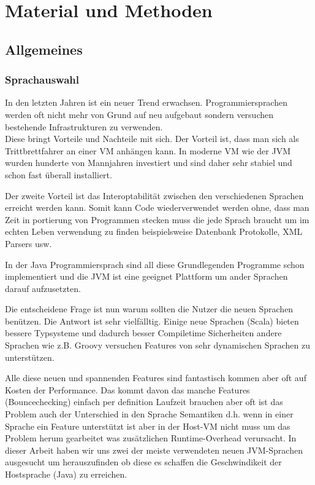 \documentclass{fancydocument}
\begin{document}
\section{Material und Methoden}

\subsection{Allgemeines}

\subsubsection{Sprachauswahl}

In den letzten Jahren ist ein neuer Trend
erwachsen. Programmiersprachen werden oft nicht mehr von Grund auf neu
aufgebaut sondern versuchen bestehende Infrastrukturen zu verwenden.
\\
Diese bringt Vorteile und Nachteile mit sich. Der Vorteil ist, dass
man sich als Trittbrettfahrer an einer VM anh\"angen kann. In moderne
VM wie der JVM wurden hunderte von Mannjahren investiert und sind
daher sehr stabiel und schon fast \"uberall installiert.

Der zweite Vorteil ist das Interoptabilit\"at zwischen den
verschiedenen Sprachen erreicht werden kann. Somit kann Code
wiederverwendet werden ohne, dass man Zeit in portierung von
Programmen stecken muss die jede Sprach braucht um im echten Leben
verwendung zu finden beispielsweise Datenbank Protokolle, XML Parsers usw.

In der Java Programmiersprach sind all diese Grundlegenden Programme
schon implementiert und die JVM ist eine geeignet Plattform um ander
Sprachen darauf aufzusetzten.

Die entscheidene Frage ist nun warum sollten die Nutzer die neuen
Sprachen ben\"utzen. Die Antwort ist sehr vielf\"alltig. Einige neue
Sprachen (Scala) bieten bessere Typsysteme und dadurch besser
Compiletime Sicherheiten andere Sprachen wie z.B. Groovy versuchen Features
von sehr dynamischen Sprachen zu unterst\"utzen.

Alle diese neuen und spannenden Features sind fantastisch kommen aber
oft auf Kosten der Performance. Das kommt davon das manche Features (Bouncechecking)
einfach per definition Laufzeit brauchen aber oft ist das Problem auch der Unterschied in
den Sprache Semantiken d.h. wenn in einer Sprache ein Feature
unterst\"utzt ist aber in der Host-VM nicht muss um das Problem herum
gearbeitet was zus\"atzlichen Runtime-Overhead verursacht. In dieser
Arbeit haben wir uns zwei der meiste verwendeten neuen JVM-Sprachen
ausgesucht um herauszufinden ob diese es schaffen die Geschwindikeit
der Hostsprache (Java) zu erreichen.
\end{document}
